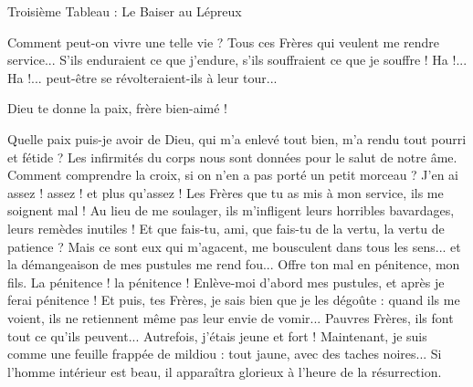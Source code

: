 \documentclass[a5paper,12pt]{article}
\begin{document}
\thispagestyle{empty}
\setlength\parindent{0pt}

\begin{center}
\large
Troisième Tableau : Le Baiser au Lépreux
\end{center}


\begin{dialogue}
   Comment peut-on vivre une telle vie ? Tous ces Frères qui veulent me rendre service... S'ils enduraient ce que j'endure, s'ils souffraient ce que je souffre ! Ha !... Ha !... peut-être se révolteraient-ils à leur tour...
\end{dialogue}


\begin{dialogue}
   Dieu te donne la paix, frère bien-aimé !
\end{dialogue}


\begin{dialogue}
   Quelle paix puis-je avoir de Dieu, qui m'a enlevé tout bien, m'a rendu tout pourri et fétide ?
   Les infirmités du corps nous sont données pour le salut de notre âme. Comment comprendre la croix, si on n'en a pas porté un petit morceau ?
   J'en ai assez ! assez ! et plus qu'assez ! Les Frères que tu as mis à mon service, ils me soignent mal ! Au lieu de me soulager, ils m'infligent leurs horribles bavardages, leurs remèdes inutiles !
   Et que fais-tu, ami, que fais-tu de la vertu, la vertu de patience ?
   Mais ce sont eux qui m'agacent, me bousculent dans tous les sens... et la démangeaison de mes pustules me rend fou...
   Offre ton mal en pénitence, mon fils.
   La pénitence ! la pénitence ! Enlève-moi d'abord mes pustules, et après je ferai pénitence ! Et puis, tes Frères, je sais bien que je les dégoûte : quand ils me voient, ils ne retiennent même pas leur envie de vomir...
   Pauvres Frères, ils font tout ce qu'ils peuvent...
   Autrefois, j'étais jeune et fort ! Maintenant, je suis comme une feuille frappée de mildiou : tout jaune, avec des taches noires...
   Si l'homme intérieur est beau, il apparaîtra glorieux à l'heure de la résurrection.
\end{dialogue}
\end{document}
